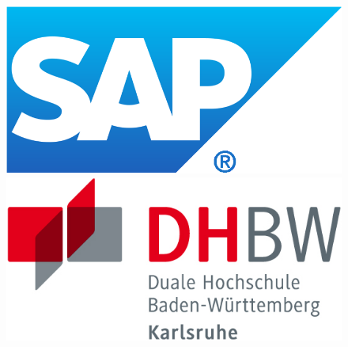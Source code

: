 
\thispagestyle{plain}

\begin{titlepage}
	\enlargethispage{4.0cm}

	\begin{center}		
		\begin{figure}
			\centering
			\begin{minipage}{.5\textwidth}
			  	\centering
			  	\includegraphics[width=.7\textwidth]{Figures/logo_sap.png}
			\end{minipage}%
			\begin{minipage}{.5\textwidth}
			  	\centering
			  	\includegraphics[width=.7\textwidth]{Figures/logo_dhbw_karlsruhe.png}
			\end{minipage}
		\end{figure}


\end{center}
\end{titlepage}

